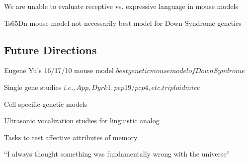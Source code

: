 \documentclass{article}
\begin{document}
We are unable to evaluate receptive vs. expressive language in mouse models

Ts65Dn mouse model not necessarily best model for Down Syndrome genetics

\subsection{Future Directions}

Eugene Yu's 16/17/10 mouse model \(best genetic mouse model of Down Syndrome\)

Single gene studies \(i.e., App, Dyrk1, pep19/pcp4, etc. triploid mice\)

Cell specific genetic models

Ultrasonic vocalization studies for linguistic analog

Tasks to test affective attributes of memory

``I always thought something was fundamentally wrong with the universe'' \citep{adams1995hitchhiker}



\end{document}
